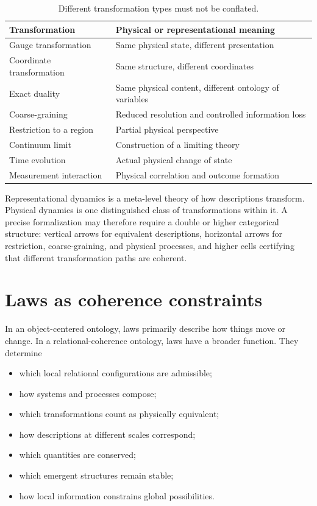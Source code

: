 \documentclass[11pt]{article}
\begin{document}
\begin{table}[ht]
\centering
\small
\renewcommand{\arraystretch}{1.2}
\begin{tabularx}{\textwidth}{>{\raggedright\arraybackslash}p{}X}
\toprule
\textbf{Transformation} & \textbf{Physical or representational meaning} \\
\midrule
Gauge transformation & Same physical state, different presentation \\
Coordinate transformation & Same structure, different coordinates \\
Exact duality & Same physical content, different ontology of variables \\
Coarse-graining & Reduced resolution and controlled information loss \\
Restriction to a region & Partial physical perspective \\
Continuum limit & Construction of a limiting theory \\
Time evolution & Actual physical change of state \\
Measurement interaction & Physical correlation and outcome formation \\
\bottomrule
\end{tabularx}
\caption{Different transformation types must not be conflated.}
\label{tab:transformations}
\end{table}

Representational dynamics is a meta-level theory of how descriptions
transform.  Physical dynamics is one distinguished class of transformations
within it.  A precise formalization may therefore require a double or higher
categorical structure: vertical arrows for equivalent descriptions, horizontal
arrows for restriction, coarse-graining, and physical processes, and higher
cells certifying that different transformation paths are coherent.

\section{Laws as coherence constraints}

In an object-centered ontology, laws primarily describe how things move or
change.  In a relational-coherence ontology, laws have a broader function.
They determine
\begin{itemize}[leftmargin=2em]
  \item which local relational configurations are admissible;
  \item how systems and processes compose;
  \item which transformations count as physically equivalent;
  \item how descriptions at different scales correspond;
  \item which quantities are conserved;
  \item which emergent structures remain stable;
  \item how local information constrains global possibilities.
\end{itemize}
\end{document}
